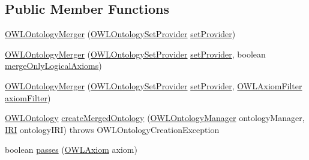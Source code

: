 \subsection*{Public Member Functions}
\begin{DoxyCompactItemize}
\item 
\hyperlink{classorg_1_1semanticweb_1_1owlapi_1_1util_1_1_o_w_l_ontology_merger_a811c62b6858e118e5ade09f3306059bf}{O\-W\-L\-Ontology\-Merger} (\hyperlink{interfaceorg_1_1semanticweb_1_1owlapi_1_1model_1_1_o_w_l_ontology_set_provider}{O\-W\-L\-Ontology\-Set\-Provider} \hyperlink{classorg_1_1semanticweb_1_1owlapi_1_1util_1_1_o_w_l_ontology_merger_a43e29f791c8384993cba9ffc61390c0b}{set\-Provider})
\item 
\hyperlink{classorg_1_1semanticweb_1_1owlapi_1_1util_1_1_o_w_l_ontology_merger_a63ef7332137f3a8970543e982c1bfe72}{O\-W\-L\-Ontology\-Merger} (\hyperlink{interfaceorg_1_1semanticweb_1_1owlapi_1_1model_1_1_o_w_l_ontology_set_provider}{O\-W\-L\-Ontology\-Set\-Provider} \hyperlink{classorg_1_1semanticweb_1_1owlapi_1_1util_1_1_o_w_l_ontology_merger_a43e29f791c8384993cba9ffc61390c0b}{set\-Provider}, boolean \hyperlink{classorg_1_1semanticweb_1_1owlapi_1_1util_1_1_o_w_l_ontology_merger_afbd869e4ce6ccd3aa4bb0692c7f2c7b4}{merge\-Only\-Logical\-Axioms})
\item 
\hyperlink{classorg_1_1semanticweb_1_1owlapi_1_1util_1_1_o_w_l_ontology_merger_aed0d7f540678617757485af45ba85f8b}{O\-W\-L\-Ontology\-Merger} (\hyperlink{interfaceorg_1_1semanticweb_1_1owlapi_1_1model_1_1_o_w_l_ontology_set_provider}{O\-W\-L\-Ontology\-Set\-Provider} \hyperlink{classorg_1_1semanticweb_1_1owlapi_1_1util_1_1_o_w_l_ontology_merger_a43e29f791c8384993cba9ffc61390c0b}{set\-Provider}, \hyperlink{interfaceorg_1_1semanticweb_1_1owlapi_1_1util_1_1_o_w_l_axiom_filter}{O\-W\-L\-Axiom\-Filter} \hyperlink{classorg_1_1semanticweb_1_1owlapi_1_1util_1_1_o_w_l_ontology_merger_aeda588ad8f414ac7d785f53d5c3a59dd}{axiom\-Filter})
\item 
\hyperlink{interfaceorg_1_1semanticweb_1_1owlapi_1_1model_1_1_o_w_l_ontology}{O\-W\-L\-Ontology} \hyperlink{classorg_1_1semanticweb_1_1owlapi_1_1util_1_1_o_w_l_ontology_merger_aee16cec144a5d364b19955f3360a0def}{create\-Merged\-Ontology} (\hyperlink{interfaceorg_1_1semanticweb_1_1owlapi_1_1model_1_1_o_w_l_ontology_manager}{O\-W\-L\-Ontology\-Manager} ontology\-Manager, \hyperlink{classorg_1_1semanticweb_1_1owlapi_1_1model_1_1_i_r_i}{I\-R\-I} ontology\-I\-R\-I)  throws O\-W\-L\-Ontology\-Creation\-Exception 
\item 
boolean \hyperlink{classorg_1_1semanticweb_1_1owlapi_1_1util_1_1_o_w_l_ontology_merger_a2f72bddc663428e09c9f980034cf1df1}{passes} (\hyperlink{interfaceorg_1_1semanticweb_1_1owlapi_1_1model_1_1_o_w_l_axiom}{O\-W\-L\-Axiom} axiom)
\end{DoxyCompactItemize}
